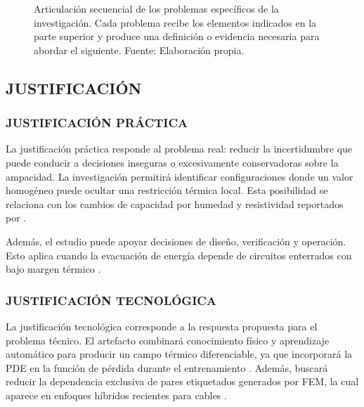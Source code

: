 \documentclass[11pt,a4paper,oneside]{report}
\begin{document}
\begin{figure}[htbp]
{%
}
\caption[Articulación de los problemas específicos]{Articulación secuencial de los problemas específicos de la investigación. Cada problema recibe los elementos indicados en la parte superior y produce una definición o evidencia necesaria para abordar el siguiente. Fuente: Elaboración propia.}
\label{fig:articulacion-problemas-especificos}
\end{figure}

\subsection{JUSTIFICACIÓN}

\subsubsection{JUSTIFICACIÓN PRÁCTICA}

La justificación práctica responde al problema real: reducir la incertidumbre que puede conducir a decisiones inseguras o excesivamente conservadoras sobre la ampacidad. La investigación permitirá identificar configuraciones donde un valor homogéneo puede ocultar una restricción térmica local. Esta posibilidad se relaciona con los cambios de capacidad por humedad y resistividad reportados por \textcite[1,6--9]{khumalo2025}.

Además, el estudio puede apoyar decisiones de diseño, verificación y operación. Esto aplica cuando la evacuación de energía depende de circuitos enterrados con bajo margen térmico \parencite[14842,14851]{fariz2026}.

\subsubsection{JUSTIFICACIÓN TECNOLÓGICA}

La justificación tecnológica corresponde a la respuesta propuesta para el problema técnico. El artefacto combinará conocimiento físico y aprendizaje automático para producir un campo térmico diferenciable, ya que incorporará la PDE en la función de pérdida durante el entrenamiento \parencite[686--690]{raissi2019}. Además, buscará reducir la dependencia exclusiva de pares etiquetados generados por FEM, la cual aparece en enfoques híbridos recientes para cables \parencite[1--3,12]{aldulaimi2024}.
\end{document}
